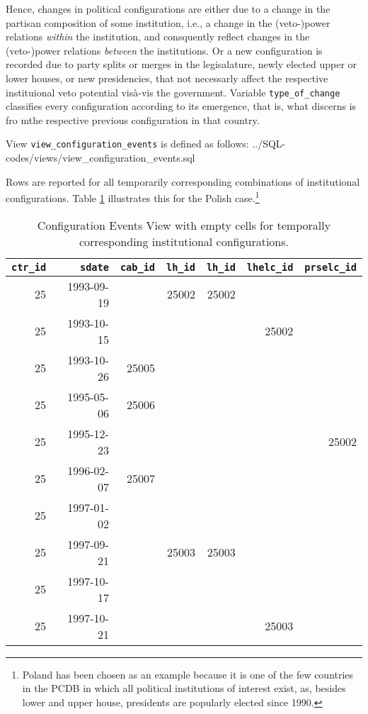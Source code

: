 Hence, changes in political configurations are either due to a change in the partisan composition of some institution, i.e., a change in the (veto-)power relations \emph{within} the institution, and consquently reflect changes in the (veto-)power relations \emph{between} the institutions.
Or a new configuration is recorded due to party splits or merges in the legisalature, newly elected upper or lower houses, or new presidencies, that not necessarly affect the respective instituional veto potential vis\`a-vis the government.
Variable \texttt{type\_of\_change} classifies every configuration according to its emergence, that is, what discerns is fro mthe respective previous configuration in that country.

View \texttt{view\_configuration\_events} is defined as follows:
%
{../SQL-codes/views/view_configuration_events.sql}

Rows are reported for all temporarily corresponding combinations of institutional configurations. 
Table \ref{tab_view_config_events_empty_cells}  illustrates this for the Polish case.\footnote{%
Poland has been chosen as an example because it is one of the few countries in the PCDB in which all political institutions of interest exist, as, besides lower and upper house, presidents are popularly elected since 1990.}

\begin{table}[h!]
\centering\footnotesize
\caption{Configuration Events View with empty cells for temporally corresponding institutional configurations.}
\label{tab_view_config_events_empty_cells}
\begin{tabular}{r r r r r r r}
\tabularnewline\toprule\toprule
\multicolumn{1}{r}{\texttt{ctr\_id}}	&
\multicolumn{1}{r}{\texttt{sdate}}	&	
\multicolumn{1}{r}{\texttt{cab\_id}}	&
\multicolumn{1}{r}{\texttt{lh\_id}}	&
\multicolumn{1}{r}{\texttt{lh\_id}}	&	
\multicolumn{1}{r}{\texttt{lhelc\_id}}	&	
\multicolumn{1}{r}{\texttt{prselc\_id}}	\\\midrule
25	&	1993-09-19	&		&	25002	&	25002	&		&		\\
25	&	1993-10-15	&		&		&		&	25002	&		\\
25	&	1993-10-26	&	25005	&		&		&		&		\\
25	&	1995-05-06	&	25006	&		&		&		&		\\
25	&	1995-12-23	&		&		&		&		&	25002	\\
25	&	1996-02-07	&	25007	&		&		&		&		\\
25	&	1997-01-02	&		&		&		&		&		\\
25	&	1997-09-21	&		&	25003	&	25003	&		&		\\
25	&	1997-10-17	&		&		&		&		&		\\
25	&	1997-10-21	&		&		&		&	25003	&		\\\bottomrule\bottomrule
\end{tabular}
\end{table}

